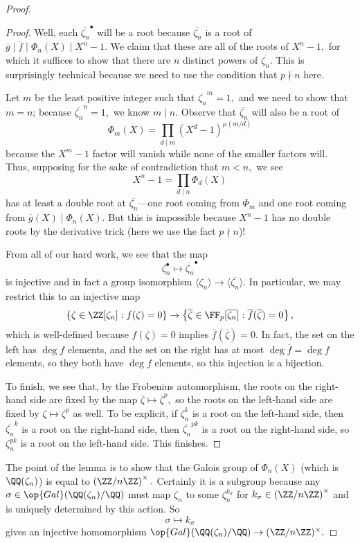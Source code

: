 \begin{proof}
\begin{proof}
		Well, each $\overline{\zeta_n}^\bullet$ will be a root because $\overline{\zeta_n}$ is a root of $\overline g\mid\overline f\mid\Phi_n(X)\mid X^n-1.$ We claim that these are all of the roots of $X^n-1,$ for which it suffices to show that there are $n$ distinct powers of $\overline{\zeta_n}.$ This is surprisingly technical because we need to use the condition that $p\nmid n$ here.

		Let $m$ be the least positive integer such that $\overline{\zeta_n}^m=1,$ and we need to show that $m=n$; because $\overline{\zeta_n}^n=1,$ we know $m\mid n.$ Observe that $\overline{\zeta_n}$ will also be a root of
		\[\Phi_m(X)=\prod_{d\mid m}\left(X^d-1\right)^{\mu(m/d)}\]
		because the $X^m-1$ factor will vanish while none of the smaller factors will. Thus, supposing for the sake of contradiction that $m<n,$ we see
		\[X^n-1=\prod_{d\mid n}\Phi_d(X)\]
		has at least a double root at $\overline{\zeta_n}$---one root coming from $\Phi_m$ and one root coming from $\overline g(X)\mid\Phi_n(X).$ But this is impossible because $X^n-1$ has no double roots by the derivative trick (here we use the fact $p\nmid n$)!

		From all of our hard work, we see that the map
		\[\zeta_n^\bullet\mapsto\overline{\zeta_n}^\bullet\]
		is injective and in fact a group isomorphism $\langle\zeta_n\rangle\to\langle\overline{\zeta_n}\rangle.$ In particular, we may restrict this to an injective map
		\[\{\zeta\in\ZZ[\zeta_n]:f(\zeta)=0\}\to\left\{\overline\zeta\in\FF_p[\overline{\zeta_n}]:\overline f(\overline\zeta)=0\right\},\]
		which is well-defined because $f(\zeta)=0$ implies $\overline f(\overline\zeta)=0.$ In fact, the set on the left has $\deg f$ elements, and the set on the right has at most $\deg\overline f=\deg f$ elements, so they both have $\deg f$ elements, so this injection is a bijection.

		To finish, we see that, by the Frobenius automorphism, the roots on the right-hand side are fixed by the map $\overline\zeta\mapsto\overline\zeta^p,$ so the roots on the left-hand side are fixed by $\zeta\mapsto\zeta^p$ as well. To be explicit, if $\zeta_n^k$ is a root on the left-hand side, then $\overline{\zeta_n}^k$ is a root on the right-hand side, then $\overline{\zeta_n}^{pk}$ is a root on the right-hand side, so $\zeta_n^{pk}$ is a root on the left-hand side. This finishes.
	\end{proof}
	The point of the lemma is to show that the Galois group of $\Phi_n(X)$ (which is $\QQ(\zeta_n)$) is equal to $\left(\ZZ/n\ZZ\right)^\times.$ Certainly it is a subgroup because any $\sigma\in\op{Gal}(\QQ(\zeta_n)/\QQ)$ must map $\zeta_n$ to some $\zeta_n^{k_\sigma}$ for $k_\sigma\in\left(\ZZ/n\ZZ\right)^\times$ and is uniquely determined by this action. So
	\[\sigma\mapsto k_\sigma\]
	gives an injective homomorphism $\op{Gal}(\QQ(\zeta_n)/\QQ)\to(\ZZ/n\ZZ)^\times.$


\end{proof}
